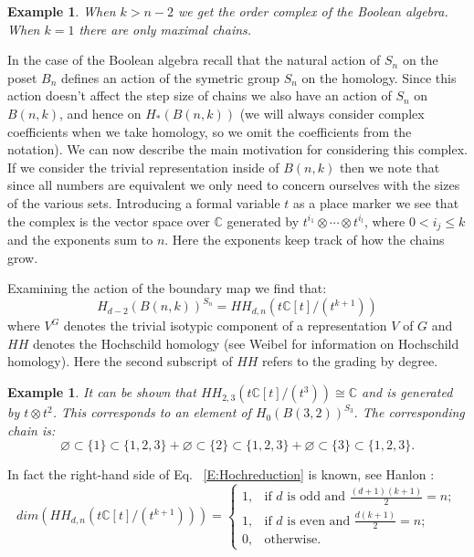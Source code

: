 \documentclass{elsart}
\newtheorem{example}[theorem]{Example}
\newcommand{\C}{\mathbb{C}}
\begin{document}
\begin{example} When $k > n-2$ we get the order complex of the Boolean algebra. When $k=1$ there are only maximal chains.
\end{example}


In the case of the Boolean algebra recall that
the natural action of $S_n$ on the poset $B_n$ defines an action of the symetric group $S_n$ on the homology. Since this action doesn't 
affect the step size of chains we also have an action of $S_n$ on $B(n, k)$, and hence on $H_*(B(n, k))$ (we will always 
consider
complex coefficients when we take homology, so we omit the coefficients from the notation). We can now describe the
main motivation for considering this complex. If we consider the trivial representation inside of $B(n, k)$ then we
note that since all numbers are equivalent we only need to concern ourselves with the sizes of the various sets. 
Introducing a formal variable $t$ as a place marker we see that the complex is the vector space over $\C$ generated
by $t^{i_1}\otimes \cdots \otimes t^{i_l}$, where $0 <i_j \le k$ and the exponents sum to $n$.
 Here the exponents keep track of how the chains grow. 



Examining the action of the boundary map we find that:
\begin{equation} \label{E:Hochreduction}
  H_{d-2}(B(n, k))^{S_n} = HH_{d, n}(t\C[t]/(t^{k+1}))
\end{equation}
where $V^G$  denotes the trivial isotypic component of a representation $V$ of $G$ and $HH$ denotes the Hochschild 
homology (see Weibel \cite{Weibel} for information on Hochschild homology). Here the second 
subscript of $HH$ refers to the grading by degree. 

\begin{example}

  It can be shown that $HH_{2,3}(t\C[t]/(t^3)) \cong \C$ and is generated by $t \otimes t^2$. 
  This  
  corresponds to an element of $H_0(B(3, 2))^{S_3}.$ The corresponding chain is:
  $$ \varnothing \subset \{1\} \subset \{1, 2, 3\} + \varnothing \subset \{2\} \subset \{1, 2, 3\} + \varnothing \subset 
     \{3\} \subset \{1, 2, 3\}.$$
\end{example}

In fact the right-hand side of Eq. ~\ref{E:Hochreduction} is known, see 
Hanlon \cite{HanlonMac}:
\begin{equation} \label{E:HH}
  dim(HH_{d, n}(t\C[t]/(t^{k+1}))) = 
  \begin{cases} 
   1, &\text{if $d$ is odd and $\frac{(d+1)(k+1)}{2} = n;$}\\
   1, &\text{if $d$ is even and $\frac{d(k+1)}{2} = n;$}\\
   0, &\text{otherwise.}
  \end{cases}
\end{equation}
\end{document}
